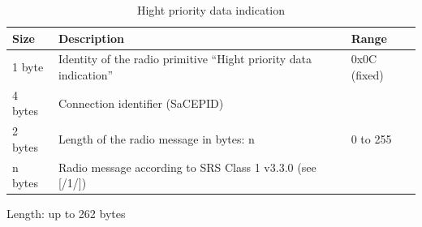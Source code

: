 \documentclass[nocc]{template/openetcs_report}
\begin{document}
 			\begin{longtable}{|l|l|l|}
				\caption{Hight priority data indication}\\ 
				\hline
				
					\begin{minipage}[t]{0.1\linewidth} \textbf{Size}	\end{minipage}
				&	\begin{minipage}[t]{0.5\linewidth} \textbf{Description}	\end{minipage}
				&	\begin{minipage}[t]{0.3\linewidth} \textbf{Range} \end{minipage} \\
				
				\hline
					 \begin{minipage}[t]{0.1\linewidth}1 byte \end{minipage}
					&\begin{minipage}[t]{0.6\linewidth}Identity of the radio primitive "`Hight priority data indication"'	\end{minipage}
					&\begin{minipage}[t]{0.3\linewidth}0x0C (fixed) \end{minipage} \\
					
				\hline
					 \begin{minipage}[t]{0.1\linewidth}4 bytes \end{minipage}
					&\begin{minipage}[t]{0.6\linewidth}Connection identifier (SaCEPID)	\end{minipage}
					&\begin{minipage}[t]{0.3\linewidth} \end{minipage} \\
					
				\hline
					 \begin{minipage}[t]{0.1\linewidth}2 bytes \end{minipage}
					&\begin{minipage}[t]{0.6\linewidth}Length of the radio message in bytes: n	\end{minipage}
					&\begin{minipage}[t]{0.3\linewidth}0 to 255 \end{minipage} \\
					
				\hline
					 \begin{minipage}[t]{0.1\linewidth}n bytes \end{minipage}
					&\begin{minipage}[t]{0.6\linewidth}Radio message according to SRS Class 1 v3.3.0 (see [/1/])	\end{minipage}
					&\begin{minipage}[t]{0.3\linewidth}\end{minipage} \\
					
				\hline	
			\end{longtable}
			Length: up to 262 bytes
\end{document}
